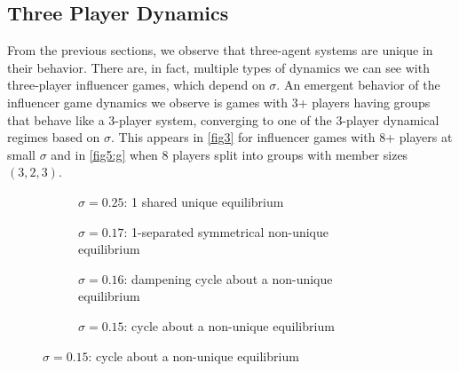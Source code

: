 \documentclass{article}
\begin{document}
        \subsection{Three Player Dynamics}
            From the previous sections, we observe that three-agent systems are unique in their behavior. There are, in fact, multiple types of dynamics we can see with three-player influencer games, which depend on $\sigma$. An emergent behavior of the influencer game dynamics we observe is games with 3+ players having groups that behave like a 3-player system, converging to one of the 3-player dynamical regimes based on $\sigma$. This appears in \cref{fig3} for influencer games with 8+ players at small $\sigma$ and in \cref{fig5:g} when 8 players split into groups with member sizes $(3,2,3)$.
            \begin{figure}[ht!] 
            \centering
                \begin{subfigure}[b]{.47\linewidth}
                     
                    \caption{$\sigma=0.25$: 1 shared unique equilibrium } 
                    \label{fig6:a} 
                \end{subfigure} 
                \begin{subfigure}[b]{.47\linewidth}
                    
                    \caption{$\sigma=0.17$: 1-separated symmetrical non-unique equilibrium} 
                    \label{fig6:b} 
                \end{subfigure} 
                \vspace{4ex}
            
                \begin{subfigure}[b]{.47\linewidth}
                    
                    \caption{$\sigma=0.16$: dampening cycle about a non-unique equilibrium}
                    \label{fig6:c} 
                \end{subfigure}
                \begin{subfigure}[b]{.47\linewidth}
                    
                    \caption{$\sigma=0.15$: cycle about a non-unique equilibrium} 
                    \label{fig6:d} 
                \end{subfigure} 
                \vspace{4ex}
        

\end{figure}
\end{document}
